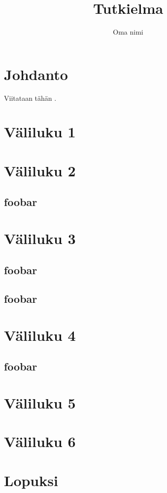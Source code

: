 \documentclass[a4paper,12pt,language=finnish]{utuftthesis}
\title{Tutkielma}
\author{Oma nimi}
\begin{document}
\maketitle
\begin{abstract}\blindtext\end{abstract}

\tableofcontents
\listoffigures
\listoftables

\chapter{Johdanto}
\Blindtext
Viitataan tähän \cite{crawley2007write}.

\chapter{Väliluku 1}
\Blindtext

\chapter{Väliluku 2}
\section{foobar}
\Blindtext

\chapter{Väliluku 3}
\section{foobar}
\Blindtext
\section{foobar}
\Blindtext

\chapter{Väliluku 4}
\section{foobar}
\Blindtext

\chapter{Väliluku 5}
\Blindtext

\chapter{Väliluku 6}
\Blindtext

\chapter{Lopuksi}

\blindtext

\printbibliography

\Blindtext
\end{document}
